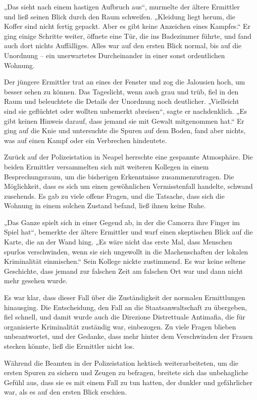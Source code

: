 \documentclass[
]{article}
\begin{document}
„Das sieht nach einem hastigen Aufbruch aus``, murmelte der ältere
Ermittler und ließ seinen Blick durch den Raum schweifen. „Kleidung
liegt herum, die Koffer sind nicht fertig gepackt. Aber es gibt keine
Anzeichen eines Kampfes.`` Er ging einige Schritte weiter, öffnete eine
Tür, die ins Badezimmer führte, und fand auch dort nichts Auffälliges.
Alles war auf den ersten Blick normal, bis auf die Unordnung -- ein
unerwartetes Durcheinander in einer sonst ordentlichen Wohnung.

Der jüngere Ermittler trat an eines der Fenster und zog die Jalousien
hoch, um besser sehen zu können. Das Tageslicht, wenn auch grau und
trüb, fiel in den Raum und beleuchtete die Details der Unordnung noch
deutlicher. „Vielleicht sind sie geflüchtet oder wollten unbemerkt
abreisen``, sagte er nachdenklich. „Es gibt keinen Hinweis darauf, dass
jemand sie mit Gewalt mitgenommen hat.`` Er ging auf die Knie und
untersuchte die Spuren auf dem Boden, fand aber nichts, was auf einen
Kampf oder ein Verbrechen hindeutete.

Zurück auf der Polizeistation in Neapel herrschte eine gespannte
Atmosphäre. Die beiden Ermittler versammelten sich mit weiteren Kollegen
in einem Besprechungsraum, um die bisherigen Erkenntnisse
zusammenzutragen. Die Möglichkeit, dass es sich um einen gewöhnlichen
Vermisstenfall handelte, schwand zusehends. Es gab zu viele offene
Fragen, und die Tatsache, dass sich die Wohnung in einem solchen Zustand
befand, ließ ihnen keine Ruhe.

„Das Ganze spielt sich in einer Gegend ab, in der die Camorra ihre
Finger im Spiel hat``, bemerkte der ältere Ermittler und warf einen
skeptischen Blick auf die Karte, die an der Wand hing. „Es wäre nicht
das erste Mal, dass Menschen spurlos verschwinden, wenn sie sich
ungewollt in die Machenschaften der lokalen Kriminalität einmischen.``
Sein Kollege nickte zustimmend. Es war keine seltene Geschichte, dass
jemand zur falschen Zeit am falschen Ort war und dann nicht mehr gesehen
wurde.

Es war klar, dass dieser Fall über die Zuständigkeit der normalen
Ermittlungen hinausging. Die Entscheidung, den Fall an die
Staatsanwaltschaft zu übergeben, fiel schnell, und damit wurde auch die
Direzione Distrettuale Antimafia, die für organisierte Kriminalität
zuständig war, einbezogen. Zu viele Fragen blieben unbeantwortet, und
der Gedanke, dass mehr hinter dem Verschwinden der Frauen stecken
könnte, ließ die Ermittler nicht los.

Während die Beamten in der Polizeistation hektisch weiterarbeiteten, um
die ersten Spuren zu sichern und Zeugen zu befragen, breitete sich das
unbehagliche Gefühl aus, dass sie es mit einem Fall zu tun hatten, der
dunkler und gefährlicher war, als es auf den ersten Blick erschien.
\end{document}
